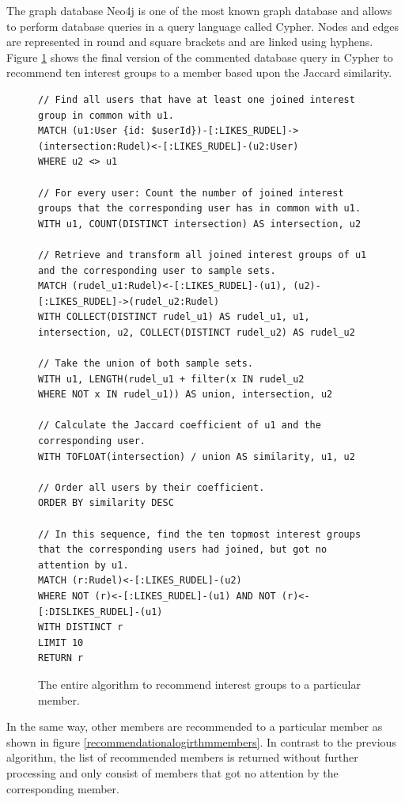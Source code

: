 \documentclass[12pt,numbers=noenddot,parskip,bibliography=totocnumbered,listof=totocnumbered,draft]{scrreprt}
\begin{document}
The graph database Neo4j \citep{neo4j} is one of the most known graph database and allows to perform database queries in a query language called Cypher. Nodes and edges are represented in round and square brackets and are linked using hyphens. Figure \ref{recommendationalogirthminterestgroups} shows the final version of the commented database query in Cypher to recommend ten interest groups to a member based upon the Jaccard similarity.

\begin{figure}
\centering
\begin{lstlisting}
// Find all users that have at least one joined interest group in common with u1.
MATCH (u1:User {id: $userId})-[:LIKES_RUDEL]->(intersection:Rudel)<-[:LIKES_RUDEL]-(u2:User) 
WHERE u2 <> u1 

// For every user: Count the number of joined interest groups that the corresponding user has in common with u1.
WITH u1, COUNT(DISTINCT intersection) AS intersection, u2 

// Retrieve and transform all joined interest groups of u1 and the corresponding user to sample sets.
MATCH (rudel_u1:Rudel)<-[:LIKES_RUDEL]-(u1), (u2)-[:LIKES_RUDEL]->(rudel_u2:Rudel) 
WITH COLLECT(DISTINCT rudel_u1) AS rudel_u1, u1, intersection, u2, COLLECT(DISTINCT rudel_u2) AS rudel_u2 

// Take the union of both sample sets.
WITH u1, LENGTH(rudel_u1 + filter(x IN rudel_u2 
WHERE NOT x IN rudel_u1)) AS union, intersection, u2 

// Calculate the Jaccard coefficient of u1 and the corresponding user. 
WITH TOFLOAT(intersection) / union AS similarity, u1, u2 

// Order all users by their coefficient.
ORDER BY similarity DESC 

// In this sequence, find the ten topmost interest groups that the corresponding users had joined, but got no attention by u1.
MATCH (r:Rudel)<-[:LIKES_RUDEL]-(u2) 
WHERE NOT (r)<-[:LIKES_RUDEL]-(u1) AND NOT (r)<-[:DISLIKES_RUDEL]-(u1) 
WITH DISTINCT r 
LIMIT 10
RETURN r
\end{lstlisting}
\caption[Algorithm to recommend interest groups]{The entire algorithm to recommend interest groups to a particular member.}
\label{recommendationalogirthminterestgroups}
\end{figure}

In the same way, other members are recommended to a particular member as shown in figure \ref{recommendationalogirthmmembers}. In contrast to the previous algorithm, the list of recommended members is returned without further processing and only consist of members that got no attention by the corresponding member.
\end{document}
